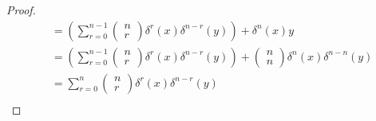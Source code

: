 \documentclass[12pt]{article}
\theoremstyle{definition}
\begin{document}
\begin{proof}
\begin{align*}
		             & = \left(\sum_{r=0}^{n-1}\begin{pmatrix}n \\ r\end{pmatrix} \delta^r(x)\delta^{n-r}(y)\right) + \delta^n(x)y                                                                \\
		             & = \left(\sum_{r=0}^{n-1}\begin{pmatrix}n \\ r\end{pmatrix} \delta^r(x)\delta^{n-r}(y)\right) + \begin{pmatrix} n \\ n \end{pmatrix}\delta^n(x)\delta^{n-n}(y)              \\
		             & = \sum_{r=0}^{n}\begin{pmatrix}n \\ r\end{pmatrix} \delta^r(x)\delta^{n-r}(y)                                                                                              \\
	\end{align*}
\end{proof}
\end{document}

